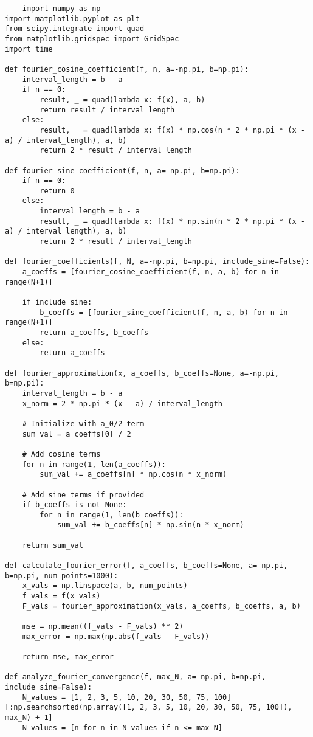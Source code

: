 \documentclass{article}
\begin{document}
\begin{verbatim}
    import numpy as np
import matplotlib.pyplot as plt
from scipy.integrate import quad
from matplotlib.gridspec import GridSpec
import time

def fourier_cosine_coefficient(f, n, a=-np.pi, b=np.pi):
    interval_length = b - a
    if n == 0:
        result, _ = quad(lambda x: f(x), a, b)
        return result / interval_length
    else:
        result, _ = quad(lambda x: f(x) * np.cos(n * 2 * np.pi * (x - a) / interval_length), a, b)
        return 2 * result / interval_length
        
def fourier_sine_coefficient(f, n, a=-np.pi, b=np.pi):
    if n == 0:
        return 0
    else:
        interval_length = b - a
        result, _ = quad(lambda x: f(x) * np.sin(n * 2 * np.pi * (x - a) / interval_length), a, b)
        return 2 * result / interval_length

def fourier_coefficients(f, N, a=-np.pi, b=np.pi, include_sine=False):
    a_coeffs = [fourier_cosine_coefficient(f, n, a, b) for n in range(N+1)]
    
    if include_sine:
        b_coeffs = [fourier_sine_coefficient(f, n, a, b) for n in range(N+1)]
        return a_coeffs, b_coeffs
    else:
        return a_coeffs

def fourier_approximation(x, a_coeffs, b_coeffs=None, a=-np.pi, b=np.pi):
    interval_length = b - a
    x_norm = 2 * np.pi * (x - a) / interval_length
    
    # Initialize with a_0/2 term
    sum_val = a_coeffs[0] / 2
    
    # Add cosine terms
    for n in range(1, len(a_coeffs)):
        sum_val += a_coeffs[n] * np.cos(n * x_norm)
    
    # Add sine terms if provided
    if b_coeffs is not None:
        for n in range(1, len(b_coeffs)):
            sum_val += b_coeffs[n] * np.sin(n * x_norm)
            
    return sum_val

def calculate_fourier_error(f, a_coeffs, b_coeffs=None, a=-np.pi, b=np.pi, num_points=1000):
    x_vals = np.linspace(a, b, num_points)
    f_vals = f(x_vals)
    F_vals = fourier_approximation(x_vals, a_coeffs, b_coeffs, a, b)
    
    mse = np.mean((f_vals - F_vals) ** 2)
    max_error = np.max(np.abs(f_vals - F_vals))
    
    return mse, max_error

def analyze_fourier_convergence(f, max_N, a=-np.pi, b=np.pi, include_sine=False):
    N_values = [1, 2, 3, 5, 10, 20, 30, 50, 75, 100][:np.searchsorted(np.array([1, 2, 3, 5, 10, 20, 30, 50, 75, 100]), max_N) + 1]
    N_values = [n for n in N_values if n <= max_N]
    

\end{verbatim}
\end{document}
